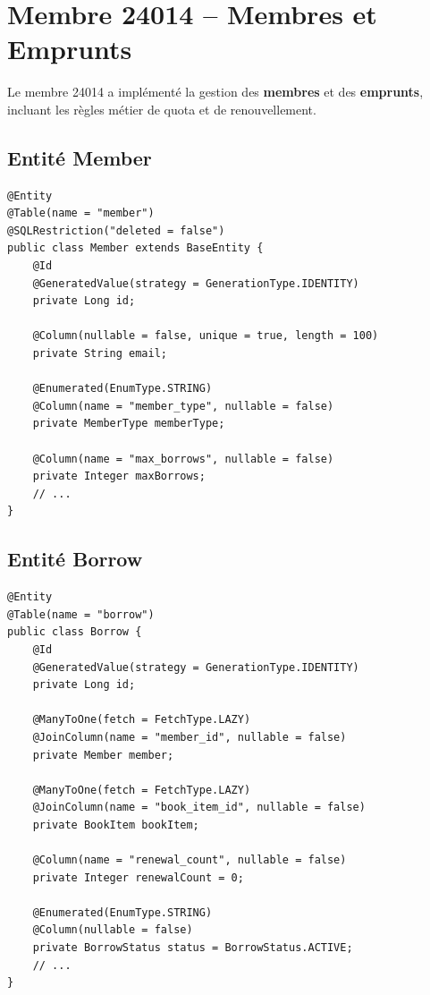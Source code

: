 \documentclass[12pt,a4paper,twoside]{report}
\begin{document}
\section{Membre 24014 -- Membres et Emprunts}

Le membre 24014 a implémenté la gestion des \textbf{membres} et des \textbf{emprunts}, incluant les règles métier de quota et de renouvellement.

\subsection{Entité Member}

\begin{lstlisting}[caption=Entité Member]
@Entity
@Table(name = "member")
@SQLRestriction("deleted = false")
public class Member extends BaseEntity {
    @Id
    @GeneratedValue(strategy = GenerationType.IDENTITY)
    private Long id;

    @Column(nullable = false, unique = true, length = 100)
    private String email;

    @Enumerated(EnumType.STRING)
    @Column(name = "member_type", nullable = false)
    private MemberType memberType;

    @Column(name = "max_borrows", nullable = false)
    private Integer maxBorrows;
    // ...
}
\end{lstlisting}

\subsection{Entité Borrow}

\begin{lstlisting}[caption=Entité Borrow]
@Entity
@Table(name = "borrow")
public class Borrow {
    @Id
    @GeneratedValue(strategy = GenerationType.IDENTITY)
    private Long id;

    @ManyToOne(fetch = FetchType.LAZY)
    @JoinColumn(name = "member_id", nullable = false)
    private Member member;

    @ManyToOne(fetch = FetchType.LAZY)
    @JoinColumn(name = "book_item_id", nullable = false)
    private BookItem bookItem;

    @Column(name = "renewal_count", nullable = false)
    private Integer renewalCount = 0;

    @Enumerated(EnumType.STRING)
    @Column(nullable = false)
    private BorrowStatus status = BorrowStatus.ACTIVE;
    // ...
}
\end{lstlisting}
\end{document}
